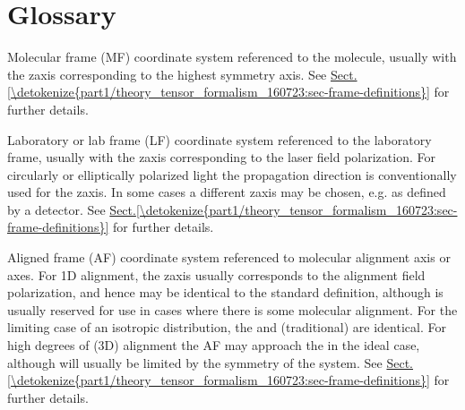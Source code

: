\documentclass[letterpaper,table,10pt,english]{jupyterBook}
\begin{document}
\chapter{Glossary}
\label{\detokenize{backmatter/glossary:glossary}}\label{\detokenize{backmatter/glossary::doc}}\begin{description}
\sphinxAtStartPar
Molecular frame (MF) \sphinxhyphen{} coordinate system referenced to the molecule, usually with the z\sphinxhyphen{}axis corresponding to the highest symmetry axis. See \hyperref[\detokenize{part1/theory_tensor_formalism_160723:sec-frame-definitions}]{Sect.\@ \ref{\detokenize{part1/theory_tensor_formalism_160723:sec-frame-definitions}}} for further details.

\sphinxAtStartPar
Laboratory or lab frame (LF) \sphinxhyphen{} coordinate system referenced to the laboratory frame, usually with the z\sphinxhyphen{}axis corresponding to the laser field polarization. For circularly or elliptically polarized light the propagation direction is conventionally used for the z\sphinxhyphen{}axis. In some cases a different z\sphinxhyphen{}axis may be chosen, e.g. as defined by a detector. See \hyperref[\detokenize{part1/theory_tensor_formalism_160723:sec-frame-definitions}]{Sect.\@ \ref{\detokenize{part1/theory_tensor_formalism_160723:sec-frame-definitions}}} for further details.

\sphinxAtStartPar
Aligned frame (AF) \sphinxhyphen{} coordinate system referenced to molecular alignment axis or axes. For 1D alignment, the z\sphinxhyphen{}axis usually corresponds to the alignment field polarization, and hence may be identical to the standard {\hyperref[\detokenize{backmatter/glossary:term-LF}]{}} definition, although is usually reserved for use in cases where there is some molecular alignment. For the limiting case of an isotropic distribution, the {\hyperref[\detokenize{backmatter/glossary:term-AF}]{}} and (traditional) {\hyperref[\detokenize{backmatter/glossary:term-LF}]{}} are identical. For high degrees of (3D) alignment the AF may approach the {\hyperref[\detokenize{backmatter/glossary:term-MF}]{}} in the ideal case, although will usually be limited by the symmetry of the system. See \hyperref[\detokenize{part1/theory_tensor_formalism_160723:sec-frame-definitions}]{Sect.\@ \ref{\detokenize{part1/theory_tensor_formalism_160723:sec-frame-definitions}}} for further details.


\end{description}
\end{document}
